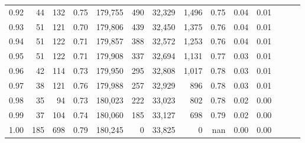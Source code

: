 \begin{tabular}{rrrrrrrrrrrrrr}
0.92 &      44 &  132 &  0.75 &  179,755 &      490 &  32,329 &   1,496 &  0.75 &  0.04 &      0.01 \\
0.93 &      51 &  121 &  0.70 &  179,806 &      439 &  32,450 &   1,375 &  0.76 &  0.04 &      0.01 \\
0.94 &      51 &  122 &  0.71 &  179,857 &      388 &  32,572 &   1,253 &  0.76 &  0.04 &      0.01 \\
0.95 &      51 &  122 &  0.71 &  179,908 &      337 &  32,694 &   1,131 &  0.77 &  0.03 &      0.01 \\
0.96 &      42 &  114 &  0.73 &  179,950 &      295 &  32,808 &   1,017 &  0.78 &  0.03 &      0.01 \\
0.97 &      38 &  121 &  0.76 &  179,988 &      257 &  32,929 &     896 &  0.78 &  0.03 &      0.01 \\
0.98 &      35 &   94 &  0.73 &  180,023 &      222 &  33,023 &     802 &  0.78 &  0.02 &      0.00 \\
0.99 &      37 &  104 &  0.74 &  180,060 &      185 &  33,127 &     698 &  0.79 &  0.02 &      0.00 \\
1.00 &     185 &  698 &  0.79 &  180,245 &        0 &  33,825 &       0 &   nan &  0.00 &      0.00 \\
\bottomrule
\end{tabular}

